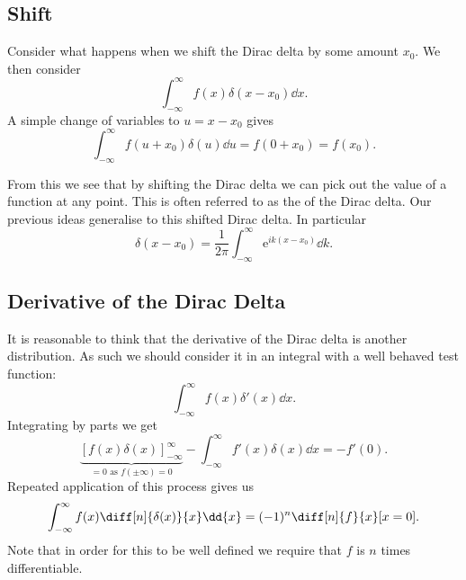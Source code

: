 \documentclass[fleqn]{NotesClass}
\newcommand*{\e}{\mathrm{e}}
\begin{document}
    \subsection{Shift}
    Consider what happens when we shift the Dirac delta by some amount \(x_0\).
    We then consider
    \begin{equation}
        \int_{-\infty}^{\infty} f(x)\delta(x - x_0) \dd{x}.
    \end{equation}
    A simple change of variables to \(u = x - x_0\) gives
    \begin{equation}
        \int_{-\infty}^{\infty} f(u + x_0)\delta(u) \dd{u} = f(0 + x_0) = f(x_0).
    \end{equation}
    
    From this we see that by shifting the Dirac delta we can pick out the value of a function at any point.
    This is often referred to as the  of the Dirac delta.
    Our previous ideas generalise to this shifted Dirac delta.
    In particular
    \begin{equation}\label{eqn:integral representation of dirac delta}
        \delta(x - x_0) = \frac{1}{2\pi} \int_{-\infty}^{\infty} \e^{ik(x - x_0)} \dd{k}.
    \end{equation}
    
    \subsection{Derivative of the Dirac Delta}
    It is reasonable to think that the derivative of the Dirac delta is another distribution.
    As such we should consider it in an integral with a well behaved test function:
    \begin{equation}
        \int_{-\infty}^{\infty} f(x)\delta'(x) \dd{x}.
    \end{equation}
    Integrating by parts we get
    \begin{equation}
        \underbrace{[f(x)\delta(x)]_{-\infty}^{\infty}}_{=0\text{ as } f(\pm \infty) = 0} - \int_{-\infty}^{\infty} f'(x)\delta(x) \dd{x} = -f'(0).
    \end{equation}
    Repeated application of this process gives us
    \begin{equation}
        \int_{-\infty}^{\infty} f(x) \diff[n]{\delta(x)}{x} \dd{x} = (-1)^n \diff[n]{f}{x}[x=0].
    \end{equation}
    Note that in order for this to be well defined we require that \(f\) is \(n\) times differentiable.
    
\end{document}
